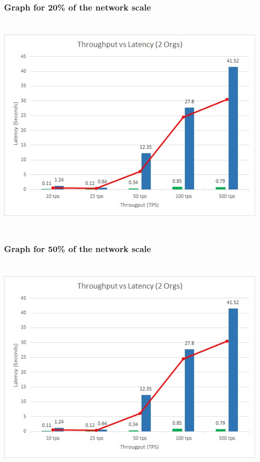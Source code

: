 \documentclass{ceadar_article}
\begin{document}
\subsubsection{Graph for 20\% of the network scale}
    \includegraphics[width=17cm,height=11cm]{ChartSample}

\subsubsection{Graph for 50\% of the network scale}
    \includegraphics[width=17cm,height=11cm]{ChartSample}
  
\end{document}
